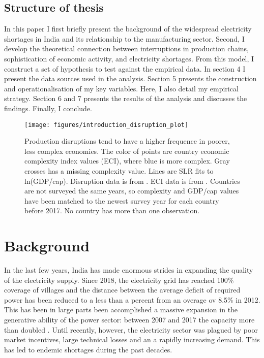 \documentclass[11pt]{article}
\begin{document}
\subsection{Structure of thesis}%
\label{sub:structure_of_thesis}
In this paper I first briefly present the background of the widespread electricity shortages in India and its relationship to the manufacturing sector. Second, I develop the theoretical connection between interruptions in production chains, sophistication of economic activity, and electricity shortages. From this model, I construct a set of hypothesis to test against the empirical data. In section 4 I present the data sources used in the analysis. Section 5 presents the construction and operationalisation of my key variables. Here, I also detail my empirical strategy. Section 6 and 7 presents the results of the analysis and discusses the findings. Finally, I conclude.


\begin{figure}[htpb]
	\centering
	\texttt{[image: figures/introduction\_disruption\_plot]}
	\caption[Production disruption, economic complexity and GDP per capita]{Production disruptions tend to have a higher frequence in poorer, less complex economies. The color of points are country economic complexity index values (ECI), where blue is more complex. Gray crosses has a missing complexity value. Lines are SLR fits to ln(GDP/cap). Disruption data is from \cite{world_bank_enterprise_2020}. ECI data is from \cite{simoes_economic_2011}. Countries are not surveyed the same years, so complexity and GDP/cap values have been matched to the newest survey year for each country before 2017. No country has more than one observation.}
	\label{fig:disruption-fig}
\end{figure}

\newpage
\section{Background}%
\label{sec:background}

In the last few years, India has made enormous strides in expanding the quality of the electricity supply. Since 2018, the electricity grid has reached 100\% coverage of villages and the distance between the average deficit of required power has been reduced to a less than a percent from an overage ov 8.5\% in 2012. This has been in large parts been accomplished a massive expansion in the generative ability of the power sector: between 2007 and 2017 the capacity more than doubled \citep{zhang_dark_2018}. Until recently, however, the electricity sector was plagued by poor market incentives, large technical losses and an a rapidly increasing demand. This has led to endemic shortages during the past decades.
\end{document}
